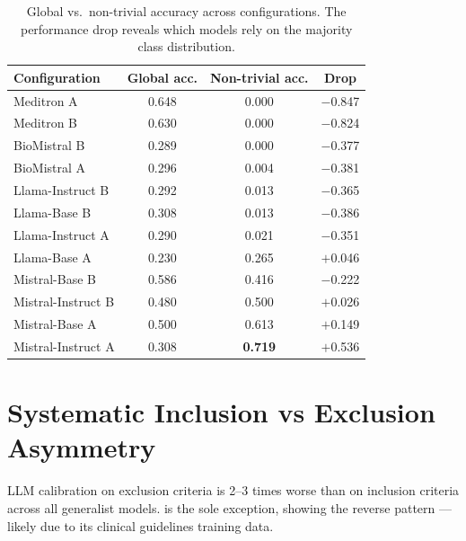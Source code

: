 \begin{table}[htbp]
    \centering
    \caption{Global vs.\ non-trivial accuracy across configurations. The
        performance drop reveals which models rely on the majority class
        distribution.}
    \label{tab:res-non-trivial}
    \small
    \begin{tabular}{@{}lccc@{}}
        \toprule
        \textbf{Configuration} & \textbf{Global acc.} & \textbf{Non-trivial acc.} & \textbf{Drop} \\
        \midrule
        Meditron A         & 0.648 & 0.000 & $-$0.847 \\
        Meditron B         & 0.630 & 0.000 & $-$0.824 \\
        BioMistral B       & 0.289 & 0.000 & $-$0.377 \\
        BioMistral A       & 0.296 & 0.004 & $-$0.381 \\
        Llama-Instruct B   & 0.292 & 0.013 & $-$0.365 \\
        Llama-Base B       & 0.308 & 0.013 & $-$0.386 \\
        Llama-Instruct A   & 0.290 & 0.021 & $-$0.351 \\
        Llama-Base A       & 0.230 & 0.265 & $+$0.046 \\
        Mistral-Base B     & 0.586 & 0.416 & $-$0.222 \\
        Mistral-Instruct B & 0.480 & 0.500 & $+$0.026 \\
        Mistral-Base A     & 0.500 & 0.613 & $+$0.149 \\
        Mistral-Instruct A & 0.308 & \textbf{0.719} & $+$0.536 \\
        \bottomrule
    \end{tabular}
\end{table}

\section{Systematic Inclusion vs Exclusion Asymmetry}
\label{sec:res-asymmetry}


\begin{finding}
    LLM calibration on exclusion criteria is 2--3 times worse than on
    inclusion criteria across all generalist models.  is
    the sole exception, showing the reverse pattern --- likely due to its
    clinical guidelines training data.
\end{finding}

